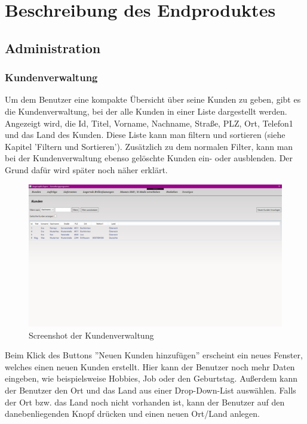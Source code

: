 \chapter{Beschreibung des Endproduktes}\label{cha:theoretical-background}
\section{Administration}
\subsection{Kundenverwaltung}
Um dem Benutzer eine kompakte Übersicht über seine Kunden zu geben, gibt es die Kundenverwaltung, bei der alle Kunden in einer Liste dargestellt werden. Angezeigt wird, die Id, Titel, Vorname, Nachname, Straße, PLZ, Ort, Telefon1 und das Land des Kunden. Diese Liste kann man filtern und sortieren (siehe Kapitel 'Filtern und Sortieren'). Zusätzlich zu dem normalen Filter, kann man bei der Kundenverwaltung ebenso gelöschte Kunden ein- oder ausblenden. Der Grund dafür wird später noch näher erklärt.
\begin{figure}[H]
\begin{center}
	\includegraphics[scale=.25]{images/Kunden.png}
\end{center}
	\caption{Screenshot der Kundenverwaltung}
	\label{fig:sample}
\end{figure}
Beim Klick des Buttons ''Neuen Kunden hinzufügen'' erscheint ein neues Fenster, welches einen neuen Kunden erstellt. Hier kann der Benutzer noch mehr Daten eingeben, wie beispielsweise Hobbies, Job oder den Geburtstag. Außerdem kann der Benutzer den Ort und das Land aus einer Drop-Down-List auswählen. Falls der Ort bzw. das Land noch nicht vorhanden ist, kann der Benutzer auf den danebenliegenden Knopf drücken und einen neuen Ort/Land anlegen. 
